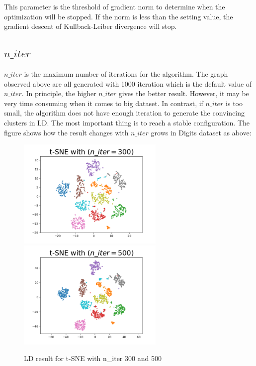 This parameter is the threshold of gradient norm to determine when the optimization will be stopped. If the norm is less than the setting value, the gradient descent of Kullback-Leiber divergence will stop.

\subsection{$n\_iter$}

\noindent $n\_iter$ is the maximum number of iterations for the algorithm. The graph observed above are all generated with 1000 iteration which is the default value of $n\_iter$. In principle, the higher $n\_iter$ gives the better result. However, it may be very time consuming when it comes to big dataset. In contrast, if $n\_iter$ is too small, the algorithm does not have enough iteration to generate the convincing clusters in LD. The most important thing is to reach a stable configuration. The figure shows how the result changes with $n\_iter$ grows in Digits dataset as above:

\begin{figure}[H]
\centering  %
{
\label{Fig.sub.1}
\includegraphics[width=7cm,height=3.5cm\textwidth]{images/t-sne/tsne_niter_300.png}}
{
\label{Fig.sub.2}
\includegraphics[width=7cm,height=3.5cm\textwidth]{images/t-sne/tsne_niter_500.png}}
\caption{LD result for t-SNE with n\_iter 300 and 500}
\end{figure}

